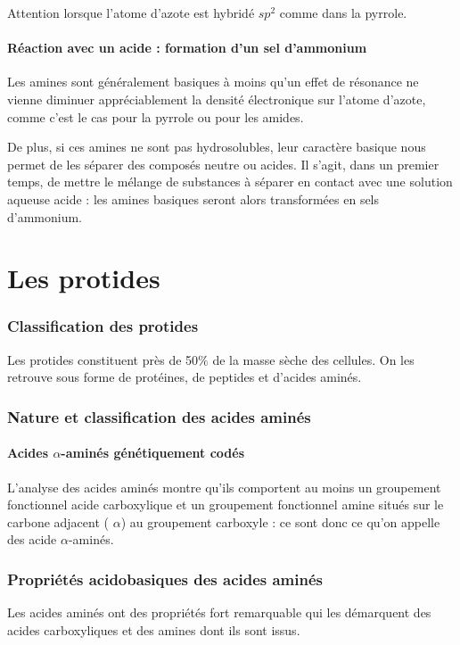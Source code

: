 Attention lorsque l'atome d'azote est hybridé $sp^2$ comme dans la pyrrole.


\subsection{Réaction avec un acide : formation d'un sel d'ammonium}
Les amines sont généralement basiques à moins qu'un effet de résonance ne vienne diminuer appréciablement la densité électronique sur l'atome d'azote, comme c'est le cas pour la pyrrole ou pour les amides.

De plus, si ces amines ne sont pas hydrosolubles, leur caractère basique nous permet de les séparer  des composés neutre ou acides.
Il s'agit, dans un premier temps, de mettre le mélange de substances à séparer en contact avec une solution aqueuse acide : les amines basiques seront alors transformées en sels d'ammonium.



\part{Les protides}
\section{Classification des protides}

Les protides constituent près de 50$\%$ de la masse sèche des cellules.
On les retrouve sous forme de protéines, de peptides et d'acides aminés.


\section{Nature et classification des acides aminés}

\subsection{Acides $\alpha$-aminés génétiquement codés}
L'analyse des acides aminés montre qu'ils comportent au moins un groupement fonctionnel acide carboxylique et un groupement fonctionnel amine situés sur le carbone adjacent ( $\alpha$) au groupement carboxyle :  ce sont donc ce qu'on appelle des acide $\alpha$-aminés.

\section{Propriétés acidobasiques des acides aminés}
Les acides aminés ont des propriétés fort remarquable qui les démarquent des acides carboxyliques et des amines dont ils sont issus.

